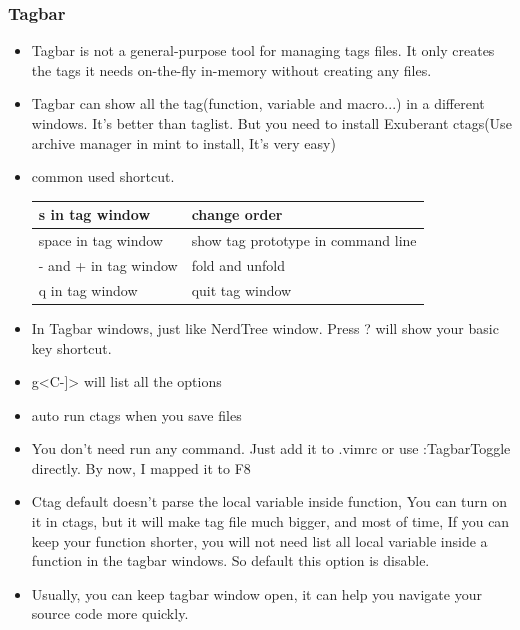 \documentclass[paper=8.5in:11in, twoside, 12pt, pagesize=pdftex]{book}
\begin{document}
									\subsubsection{Tagbar}
									\begin{itemize}
										
										\item Tagbar is not a general-purpose tool for managing tags files. It only creates the tags it needs on-the-fly in-memory without creating any files. 
										
										\item Tagbar can show all the tag(function, variable and macro...) in a different windows. It's better than taglist. But you need to install Exuberant ctags(Use archive manager in mint to install, It's very easy)
										
										\item common used shortcut.	\\	
										\begin{tabular}{|p{}|p{}|}
											\hline 
											s in tag window & change order \\ 
											
											\hline 
											space in tag window & show tag prototype in command line  \\ 
											
											\hline 
											- and + in tag window & fold and unfold \\ 
											
											\hline 
											q in tag window & quit tag window \\ 
											
											\hline 
										\end{tabular}
										
										\item In Tagbar windows, just like NerdTree window. Press ? will show your basic key shortcut. 
										
										\item g<C-]> will list all the options
										
										\item auto run ctags when you save files
										
										\item You don't need run any command. Just add it to .vimrc or use :TagbarToggle directly. By now, I mapped it to F8
										
										\item Ctag default doesn't parse the local variable inside function, You can turn on it in ctags, but it will make tag file much bigger, and most of time, If you can keep your function shorter, you will not need list all local variable inside a function in the tagbar windows. So default this option is disable. 
										
										\item Usually, you can keep tagbar window open, it can help you navigate your source code more quickly. 
									\end{itemize}
									
\end{document}
